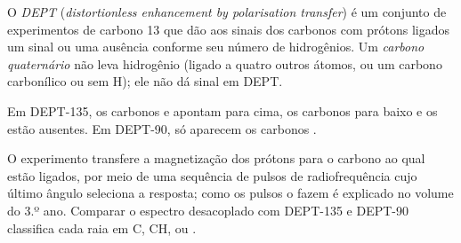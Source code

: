 \begin{definition}[DEPT]\label{def:b2:structure-determination:dept}
O \emph{DEPT} (\textit{distortionless enhancement by polarisation transfer}) é um conjunto de
experimentos de carbono 13 que dão aos sinais dos carbonos com prótons ligados um sinal ou uma ausência
conforme seu número de hidrogênios. Um \emph{carbono quaternário} não leva
hidrogênio (ligado a quatro outros átomos, ou um carbono carbonílico ou  sem H); ele não dá
sinal em DEPT.
\end{definition}

\begin{proposition}\label{prop:b2:structure-determination:dept}
Em DEPT-135, os carbonos  e  apontam para cima, os carbonos  para baixo e os
 estão ausentes. Em DEPT-90, só aparecem os carbonos .
\end{proposition}

\admitted

O experimento transfere a magnetização dos prótons para o carbono ao qual estão ligados, por meio de uma
sequência de pulsos de radiofrequência cujo último ângulo seleciona a resposta; como os pulsos o fazem é
explicado no volume do 3.º ano. Comparar o espectro desacoplado com DEPT-135 e DEPT-90 classifica cada
raia em C, CH,  ou .

